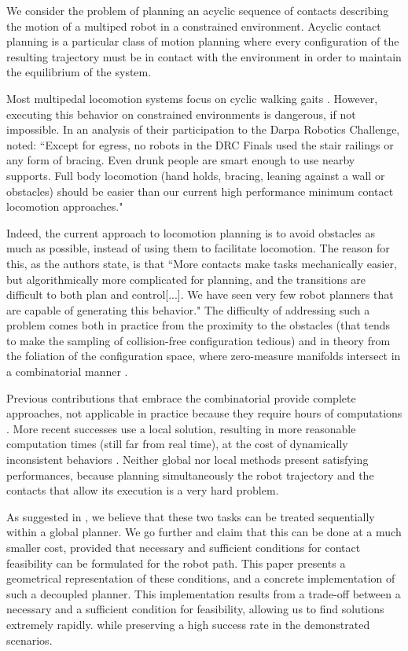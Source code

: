 We consider the problem of planning an acyclic sequence of contacts describing the motion of a multiped robot in a constrained environment. Acyclic contact planning is a particular class of motion planning where every configuration of the resulting trajectory must be in contact with the environment in order to maintain the equilibrium of the system.

Most multipedal locomotion systems focus on cyclic walking gaits \citep{Kajita03a}. However, executing
this behavior on constrained environments is dangerous, if not impossible.
In an analysis of their participation to the Darpa Robotics Challenge, \citeauthor{atkensondarpa}
noted: ``Except for egress, no robots in the DRC Finals used
the  stair  railings  or  any  form  of  bracing.   Even  drunk  people  are  smart  enough  to  use  nearby  supports.
Full body locomotion (hand holds,  bracing,  leaning against a wall or obstacles) should be easier than our
current high performance minimum contact locomotion approaches."

Indeed, the current approach to locomotion planning is to avoid obstacles as much as possible, instead of using them
to facilitate locomotion. The reason for this, as the authors state, is that ``More contacts make tasks
mechanically easier, but algorithmically more complicated for planning, and the transitions are difficult to
both plan and control[...].  We have seen very few robot planners that are  capable of  generating this  behavior."
The difficulty of addressing such a problem comes both in practice from the proximity to the obstacles (that tends to make the sampling of collision-free configuration tedious) and in theory from the foliation of the configuration space, where zero-measure manifolds intersect in a combinatorial manner \citep{simeon-manipulation-04}.

Previous contributions that embrace the combinatorial provide complete approaches, not applicable in practice because they require hours of computations \citep{Bretl:2006:MPM:1124573.1124585}.
More recent successes use a local solution, resulting in more reasonable computation times (still far from real time), at the cost of dynamically inconsistent behaviors \citep{Mordatch:2012:DCB:2185520.2185539}.
Neither global nor local methods present satisfying performances, because planning simultaneously the robot trajectory and the contacts that allow
its execution is a very hard problem. 

As suggested in \cite{Bouyarmane2009}, we believe that these two tasks can be treated sequentially within a global planner.
We go further and claim that this can be done at a much smaller cost, provided that necessary and sufficient conditions for contact feasibility can be formulated for the robot path.
This paper presents a geometrical representation of these conditions, and a concrete implementation of such a decoupled planner.
This implementation results from a trade-off between a necessary and a sufficient condition for feasibility, allowing us to find solutions extremely rapidly.
while preserving a high success rate in the demonstrated scenarios.


